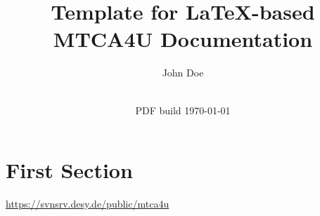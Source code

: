 \documentclass[11pt,a4paper]{scrartcl}
\title{Template for \LaTeX -based MTCA4U Documentation}
\date{\svnrevision\\ PDF build \today}
\author[1]{John Doe}
\affil[1]{Deutsches Elektronen-Synchrotron DESY, Hamburg, Germany}
\begin{document}
\maketitle

\section{First Section}
\url{https://svnsrv.desy.de/public/mtca4u}
\end{document}
